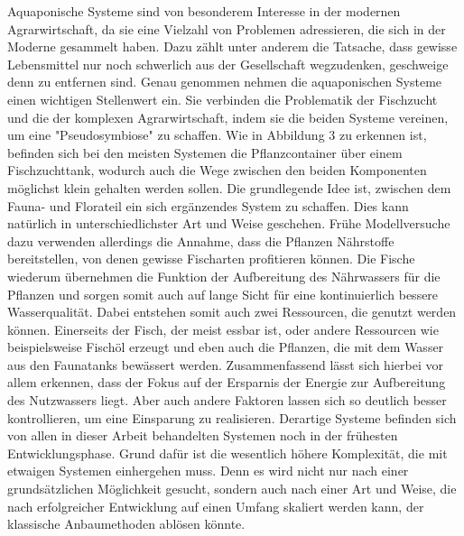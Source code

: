 Aquaponische Systeme sind von besonderem Interesse in der modernen Agrarwirtschaft, da sie eine Vielzahl von Problemen adressieren, die sich in der Moderne gesammelt haben. Dazu zählt unter anderem die Tatsache, dass gewisse Lebensmittel nur noch schwerlich aus der Gesellschaft wegzudenken, geschweige denn zu entfernen sind. Genau genommen nehmen die aquaponischen Systeme einen wichtigen Stellenwert ein. Sie verbinden die Problematik der Fischzucht und die der komplexen Agrarwirtschaft, indem sie die beiden Systeme vereinen, um eine "Pseudosymbiose" zu schaffen. Wie in Abbildung 3 zu erkennen ist, befinden sich bei den meisten Systemen die Pflanzcontainer über einem Fischzuchttank, wodurch auch die Wege zwischen den beiden Komponenten möglichst klein gehalten werden sollen. Die grundlegende Idee ist, zwischen dem Fauna- und Florateil ein sich ergänzendes System zu schaffen. Dies kann natürlich in unterschiedlichster Art und Weise geschehen. Frühe Modellversuche dazu verwenden allerdings die Annahme, dass die Pflanzen Nährstoffe bereitstellen, von denen gewisse Fischarten profitieren können. Die Fische wiederum übernehmen die Funktion der Aufbereitung des Nährwassers für die Pflanzen und sorgen somit auch auf lange Sicht für eine kontinuierlich bessere Wasserqualität. Dabei entstehen somit auch zwei Ressourcen, die genutzt werden können. Einerseits der Fisch, der meist essbar ist, oder andere Ressourcen wie beispielsweise Fischöl erzeugt und eben auch die Pflanzen, die mit dem Wasser aus den Faunatanks bewässert werden. Zusammenfassend lässt sich hierbei vor allem erkennen, dass der Fokus auf der Ersparnis der Energie zur Aufbereitung des Nutzwassers liegt. Aber auch andere Faktoren lassen sich so deutlich besser kontrollieren, um eine Einsparung zu realisieren. Derartige Systeme befinden sich von allen in dieser Arbeit behandelten Systemen noch in der frühesten Entwicklungsphase. Grund dafür ist die wesentlich höhere Komplexität, die mit etwaigen Systemen einhergehen muss. Denn es wird nicht nur nach einer grundsätzlichen Möglichkeit gesucht, sondern auch nach einer Art und Weise, die nach erfolgreicher Entwicklung auf einen Umfang skaliert werden kann, der klassische Anbaumethoden ablösen könnte.
